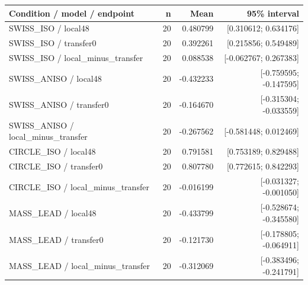 \begin{longtable}{p{.56\linewidth}rrr}
\toprule Condition / model / endpoint & n & Mean & 95\% interval\\\midrule
SWISS\_ISO / local48 & 20 & 0.480799 & [0.310612; 0.634176] \\
SWISS\_ISO / transfer0 & 20 & 0.392261 & [0.215856; 0.549489] \\
SWISS\_ISO / local\_minus\_transfer & 20 & 0.088538 & [-0.062767; 0.267383] \\
SWISS\_ANISO / local48 & 20 & -0.432233 & [-0.759595; -0.147595] \\
SWISS\_ANISO / transfer0 & 20 & -0.164670 & [-0.315304; -0.033559] \\
SWISS\_ANISO / local\_minus\_transfer & 20 & -0.267562 & [-0.581448; 0.012469] \\
CIRCLE\_ISO / local48 & 20 & 0.791581 & [0.753189; 0.829488] \\
CIRCLE\_ISO / transfer0 & 20 & 0.807780 & [0.772615; 0.842293] \\
CIRCLE\_ISO / local\_minus\_transfer & 20 & -0.016199 & [-0.031327; -0.001050] \\
MASS\_LEAD / local48 & 20 & -0.433799 & [-0.528674; -0.345580] \\
MASS\_LEAD / transfer0 & 20 & -0.121730 & [-0.178805; -0.064911] \\
MASS\_LEAD / local\_minus\_transfer & 20 & -0.312069 & [-0.383496; -0.241791] \\
\bottomrule\end{longtable}
